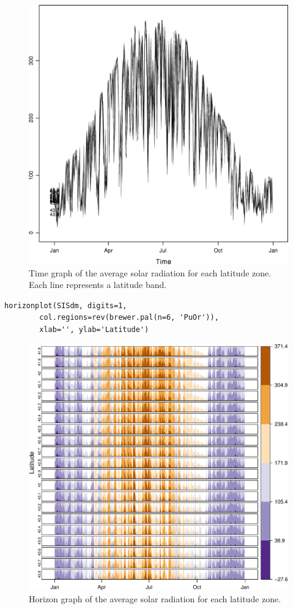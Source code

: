 \begin{figure}[htb]
\centering
\includegraphics[width=.9\linewidth]{figs/SISmm_xyplot.png}
\caption{\label{fig:SISmm_xyplot}Time graph of the average solar radiation for each latitude zone. Each line represents a latitude band.}
\end{figure}


\lstset{language=R,numbers=none}
\begin{lstlisting}
horizonplot(SISdm, digits=1,
	    col.regions=rev(brewer.pal(n=6, 'PuOr')),
	    xlab='', ylab='Latitude')
\end{lstlisting}

\begin{figure}[htb]
\centering
\includegraphics[width=.9\linewidth]{figs/SISdm_horizonplot.pdf}
\caption{\label{fig:SISdm_horizonplot}Horizon graph of the average solar radiation for each latitude zone.}
\end{figure}

